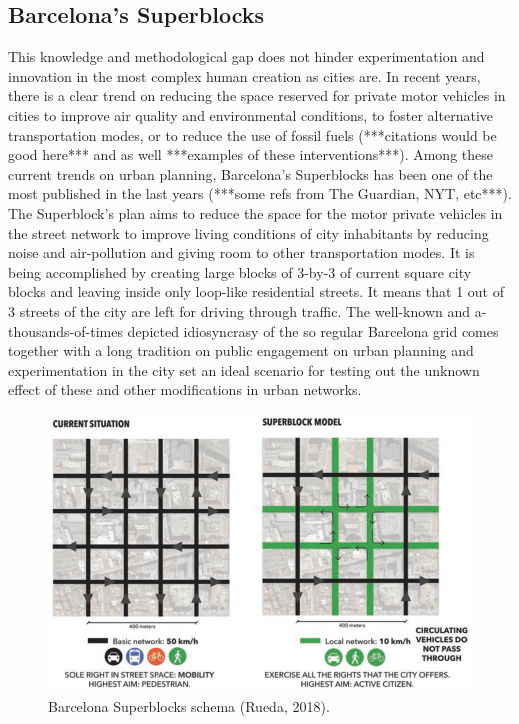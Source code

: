 \documentclass[11pt]{article}
\begin{document}
\subsection {Barcelona's Superblocks}

This knowledge and methodological gap does not hinder experimentation and innovation in the most complex human creation \citep{Levi-Strauss1955} as cities are. In recent years, there is a clear trend on reducing the space reserved for private motor vehicles in cities to improve air quality and environmental conditions, to foster alternative transportation modes, or to reduce the use of fossil fuels (***citations would be good here*** and as well ***examples of these interventions***). Among these current trends on urban planning, Barcelona's Superblocks has been one of the most published in the last years (***some refs from The Guardian, NYT, etc***). The Superblock's plan aims to reduce the space for the motor private vehicles in the street network to improve living conditions of city inhabitants by reducing noise and air-pollution and giving room to other transportation modes. \citep{Rueda2018} It is being accomplished by creating large blocks of 3-by-3 of current square city blocks and leaving inside only loop-like residential streets. It means that 1 out of 3 streets of the city are left for driving through traffic. The well-known and a-thousands-of-times depicted idiosyncrasy of the so regular Barcelona grid comes together with a long tradition on public engagement on urban planning and experimentation in the city set an ideal scenario for testing out the unknown effect of these and other modifications in urban networks.

\begin{figure}[h]
\centering
\includegraphics[scale=0.5]{bcn_superblocks_rueda_2018.png}
\caption{Barcelona Superblocks schema (Rueda, 2018).}
\label{fig:Barcelona Superblocks schema}
\end{figure}
\end{document}
